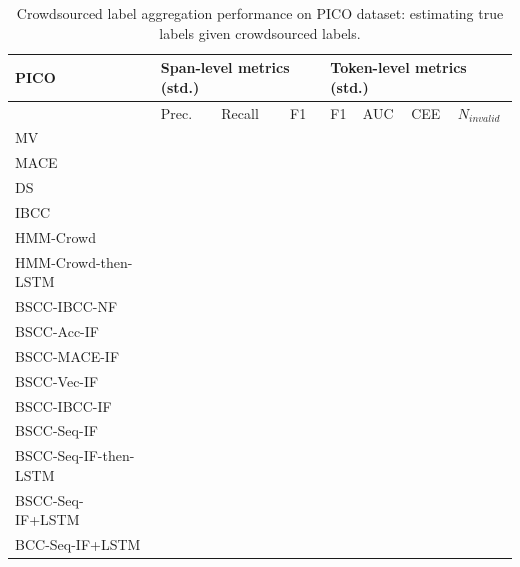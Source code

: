 \begin{table}
\begin{tabularx}{\textwidth}{| l | X | X | X | X | X | X | X |}
\hline
PICO & \multicolumn{3}{|l|}{Span-level metrics (std.)}                          & \multicolumn{4}{|l|}{Token-level metrics (std.)} \\ \hline 
& Prec. & Recall & F1 & F1 & AUC & CEE & $N_{invalid}$ \\ \hline
MV & \\
MACE & \\
DS & \\ 
IBCC & \\ \hline
HMM-Crowd & \\ 
HMM-Crowd-then-LSTM &\\ \hline
BSCC-IBCC-NF & \\ \hline
BSCC-Acc-IF & \\
BSCC-MACE-IF & \\
BSCC-Vec-IF & \\
BSCC-IBCC-IF & \\
BSCC-Seq-IF & \\ \hline
BSCC-Seq-IF-then-LSTM &\\
BSCC-Seq-IF+LSTM &\\
BCC-Seq-IF+LSTM &\\ %
\hline
\end{tabularx}
\caption{Crowdsourced label aggregation performance on PICO dataset: estimating true labels given crowdsourced labels.}
\label{tab:aggregation_results_pico}
\end{table}

